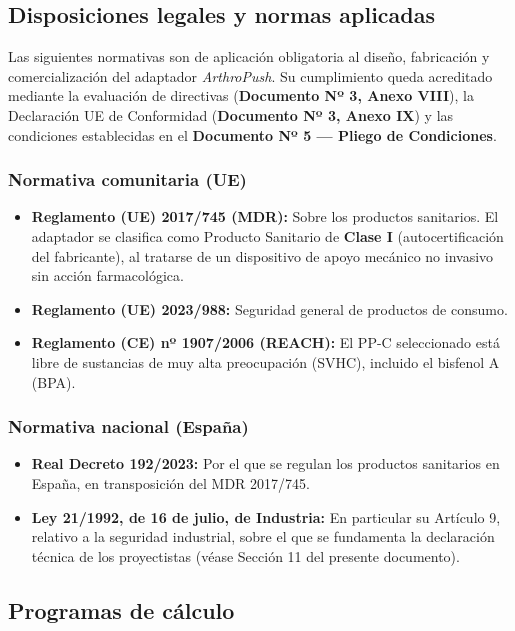 \documentclass[11pt,a4paper]{article}
\begin{document}
\subsection{Disposiciones legales y normas aplicadas}

Las siguientes normativas son de aplicación obligatoria al diseño, fabricación y comercialización del adaptador \textit{ArthroPush}. Su cumplimiento queda acreditado mediante la evaluación de directivas (\textbf{Documento Nº 3, Anexo VIII}), la Declaración UE de Conformidad (\textbf{Documento Nº 3, Anexo IX}) y las condiciones establecidas en el \textbf{Documento Nº 5 — Pliego de Condiciones}.

\subsubsection{Normativa comunitaria (UE)}

\begin{itemize}
    \item \textbf{Reglamento (UE) 2017/745 (MDR):} Sobre los productos sanitarios. El adaptador se clasifica como Producto Sanitario de \textbf{Clase I} (autocertificación del fabricante), al tratarse de un dispositivo de apoyo mecánico no invasivo sin acción farmacológica.
    \item \textbf{Reglamento (UE) 2023/988:} Seguridad general de productos de consumo.
    \item \textbf{Reglamento (CE) nº 1907/2006 (REACH):} El PP-C seleccionado está libre de sustancias de muy alta preocupación (SVHC), incluido el bisfenol A (BPA).
\end{itemize}

\subsubsection{Normativa nacional (España)}

\begin{itemize}
    \item \textbf{Real Decreto 192/2023:} Por el que se regulan los productos sanitarios en España, en transposición del MDR 2017/745.
    \item \textbf{Ley 21/1992, de 16 de julio, de Industria:} En particular su Artículo 9, relativo a la seguridad industrial, sobre el que se fundamenta la declaración técnica de los proyectistas (véase Sección 11 del presente documento).
\end{itemize}


\subsection{Programas de cálculo}
\end{document}
